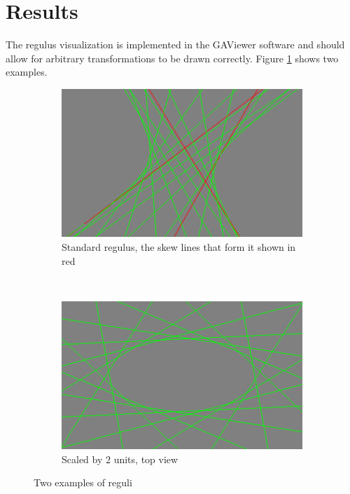 \documentclass[a4paper, 10pt]{article}
\begin{document}
\section{Results}
The regulus visualization is implemented in the GAViewer software and should
allow for arbitrary transformations to be drawn correctly. Figure
\ref{fig:reguli} shows two examples.

\begin{figure}
  \centering
  \begin{subfigure}[b]{0.5\textwidth}
    \centering
    \includegraphics[width=\textwidth]{./regulus.png}
    \caption{Standard regulus, the skew lines that form it shown in red}
  \end{subfigure}%
  ~ %
  \begin{subfigure}[b]{0.5\textwidth}
    \centering
    \includegraphics[width=\textwidth]{scaled.png}
    \caption{Scaled by 2 units, top view}
  \end{subfigure}
  \caption{Two examples of reguli}
  \label{fig:reguli}
\end{figure}
\end{document}
